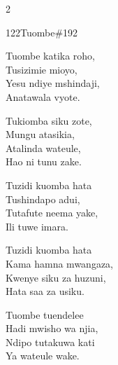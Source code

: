 \documentclass{article}
\begin{document}
\begin{multicols}{2}
\begin{hymn}{122}{Tuombe}{\#192}
\begin{stanza}
Tuombe katika roho,\\
Tusizimie mioyo,\\
Yesu ndiye mshindaji,\\
Anatawala vyote.
\end{stanza}
\begin{chorus}
Tukiomba siku zote,\\
Mungu atasikia,\\
Atalinda wateule,\\
Hao ni tunu zake.
\end{chorus}
\begin{stanza}
Tuzidi kuomba hata\\
Tushindapo adui,\\
Tutafute neema yake,\\
Ili tuwe imara.
\end{stanza}
\begin{stanza}
Tuzidi kuomba hata\\
Kama hamna mwangaza,\\
Kwenye siku za huzuni,\\
Hata saa za usiku.
\end{stanza}
\begin{stanza}
Tuombe tuendelee\\
Hadi mwisho wa njia,\\
Ndipo tutakuwa kati\\
Ya wateule wake.
\end{stanza}
\end{hymn}


\end{multicols}
\end{document}
